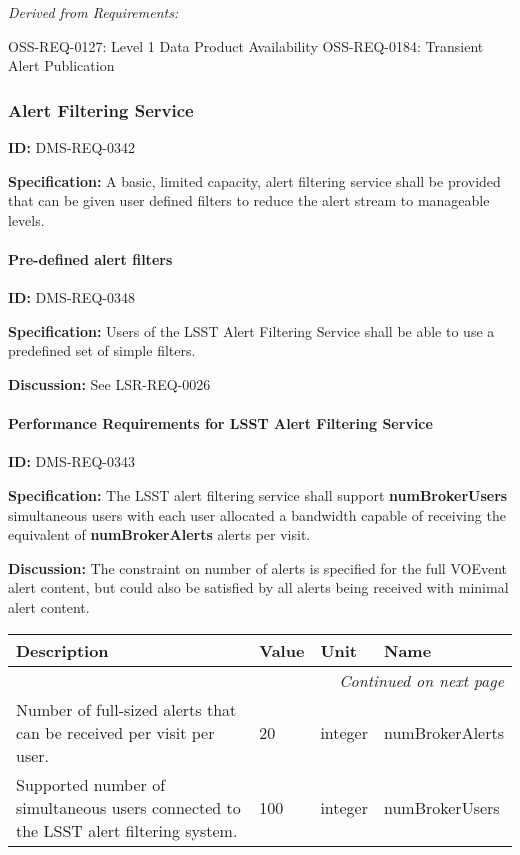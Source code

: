 \documentclass[SE,toc,lsstdraft]{lsstdoc}
\makeatletter
\newcommand{\paramname}[1]{\hspace{0pt}#1}
\newcommand{\unitname}[1]{\hspace{0pt}#1}
\newenvironment{parameters}[0]{%
\setlength\LTleft{0pt}
\setlength\LTright{\fill}
\begin{small}
\begin{longtable}[]{|p{0.5\textwidth}|l|p{0.6in}|p{1.74in}@{}|}

\hline \textbf{Description} & \textbf{Value} & \textbf{Unit} & \textbf{Name} \\ \hline
\endhead

\hline \multicolumn{4}{r}{\emph{Continued on next page}} \\
\endfoot

\hline\hline
\endlastfoot
}{%
\hline
\end{longtable}
\end{small}
}
\makeatother
\begin{document}
\emph{Derived from Requirements:}

OSS-REQ-0127:
Level 1 Data Product Availability \newline
OSS-REQ-0184:
Transient Alert Publication \newline


\subsubsection{Alert Filtering Service}

\label{DMS-REQ-0342}
\textbf{ID:} DMS-REQ-0342

\textbf{Specification:} A basic, limited capacity, alert filtering service shall be provided that can be given user defined filters to reduce the alert stream to manageable levels.







\paragraph{Pre-defined alert filters}\hfill  %

\label{DMS-REQ-0348}
\textbf{ID:} DMS-REQ-0348

\textbf{Specification: }Users of the LSST Alert Filtering Service shall be able to use a predefined set of simple filters.

\textbf{Discussion:} See LSR-REQ-0026




\paragraph{Performance Requirements for LSST Alert Filtering Service}\hfill  %

\label{DMS-REQ-0343}
\textbf{ID:} DMS-REQ-0343

\textbf{Specification:} The LSST alert filtering service shall support \textbf{numBrokerUsers} simultaneous users with each user allocated a bandwidth capable of receiving the equivalent of \textbf{numBrokerAlerts} alerts per visit.

\textbf{Discussion:} The constraint on number of alerts is specified for the full VOEvent alert content, but could also be satisfied by all alerts being received with minimal alert content.



\begin{parameters}
 Number of full-sized alerts that can be received per visit per user.
&
20
&
\unitname{%
integer
}
&
\paramname{%
numBrokerAlerts
} \\\hline
Supported number of simultaneous users connected to the LSST alert filtering system.
&
100
&
\unitname{%
integer
}
&
\paramname{%
numBrokerUsers
} \\\hline
\end{parameters}
\end{document}
